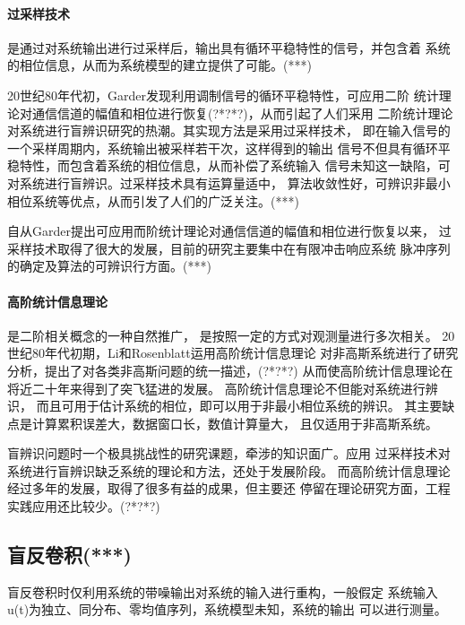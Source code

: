 \paragraph*{过采样技术}
是通过对系统输出进行过采样后，输出具有循环平稳特性的信号，并包含着
系统的相位信息，从而为系统模型的建立提供了可能。(***)

20世纪80年代初，Garder发现利用调制信号的循环平稳特性，可应用二阶
统计理论对通信信道的幅值和相位进行恢复(?*?*?)，从而引起了人们采用
二阶统计理论对系统进行盲辨识研究的热潮。其实现方法是采用过采样技术，
即在输入信号的一个采样周期内，系统输出被采样若干次，这样得到的输出
信号不但具有循环平稳特性，而包含着系统的相位信息，从而补偿了系统输入
信号未知这一缺陷，可对系统进行盲辨识。过采样技术具有运算量适中，
算法收敛性好，可辨识非最小相位系统等优点，从而引发了人们的广泛关注。(***)

自从Garder提出可应用而阶统计理论对通信信道的幅值和相位进行恢复以来，
过采样技术取得了很大的发展，目前的研究主要集中在有限冲击响应系统
脉冲序列的确定及算法的可辨识行方面。(***)

\paragraph*{高阶统计信息理论}是二阶相关概念的一种自然推广，
是按照一定的方式对观测量进行多次相关。
20世纪80年代初期，Li和Rosenblatt运用高阶统计信息理论
对非高斯系统进行了研究分析，提出了对各类非高斯问题的统一描述，(?*?*?) 
从而使高阶统计信息理论在将近二十年来得到了突飞猛进的发展。
高阶统计信息理论不但能对系统进行辨识，
而且可用于估计系统的相位，即可以用于非最小相位系统的辨识。
其主要缺点是计算累积误差大，数据窗口长，数值计算量大，
且仅适用于非高斯系统。

盲辨识问题时一个极具挑战性的研究课题，牵涉的知识面广。应用
过采样技术对系统进行盲辨识缺乏系统的理论和方法，还处于发展阶段。
而高阶统计信息理论经过多年的发展，取得了很多有益的成果，但主要还
停留在理论研究方面，工程实践应用还比较少。(?*?*?)

\subsection{盲反卷积(***)}
盲反卷积时仅利用系统的带噪输出对系统的输入进行重构，一般假定
系统输入u(t)为独立、同分布、零均值序列，系统模型未知，系统的输出
可以进行测量。

